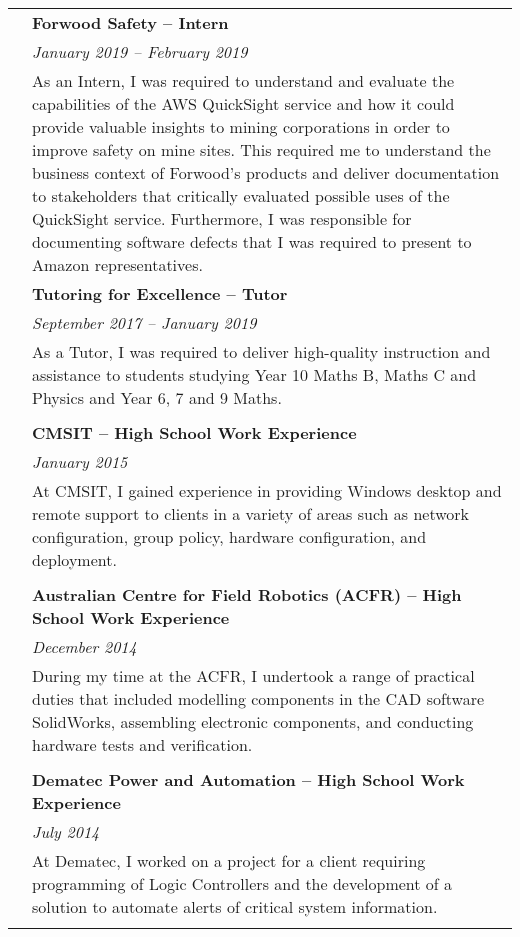 \documentclass[12pt,twoside,a4paper]{article}
\begin{document}
\begin{longtable}{r p{13cm}}
										\vline & \textbf{Forwood Safety – Intern} \\
										\vline & \textit{January 2019 – February 2019} \\
										\vline & As an Intern, I was required to understand and evaluate the capabilities of the AWS QuickSight service and how it could provide valuable insights to mining corporations in order to improve safety on mine sites. This required me to understand the business context of Forwood’s products and deliver documentation to stakeholders that critically evaluated possible uses of the QuickSight service. Furthermore, I was responsible for documenting software defects that I was required to present to Amazon representatives. \\
										
										\vline & \textbf{Tutoring for Excellence – Tutor} \\
										\vline & \textit{September 2017 – January 2019} \\
										\vline & As a Tutor, I was required to deliver high-quality instruction and assistance to students studying Year 10 Maths B, Maths C and Physics and Year 6, 7 and 9 Maths. \\
										\vline & \\
										
										\vline & \textbf{CMSIT – High School Work Experience} \\
										\vline & \textit{January 2015} \\
										\vline & At CMSIT, I gained experience in providing Windows desktop and remote support to clients in a variety of areas such as network configuration, group policy, hardware configuration, and deployment. \\
										\vline & \\
										
										\vline & \textbf{Australian Centre for Field Robotics (ACFR) – High School Work Experience} \\
										\vline & \textit{December 2014} \\
										\vline & During my time at the ACFR, I undertook a range of practical duties that included modelling components in the CAD software SolidWorks, assembling electronic components, and conducting hardware tests and verification. \\
										& \\
										
										\vline & \textbf{Dematec Power and Automation – High School Work Experience} \\
										\vline & \textit{July 2014} \\
										\vline & At Dematec, I worked on a project for a client requiring programming of Logic Controllers and the development of a solution to automate alerts of critical system information. \\
										& \\
										

\end{longtable}
\end{document}
